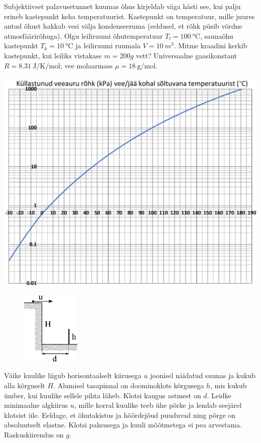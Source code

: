 \documentclass[10pt]{article}
\begin{document}
Subjektiivset palavusetunnet kuumas õhus kirjeldab väga hästi see, kui palju erineb kastepunkt keha temperatuurist. Kastepunkt on temperatuur, mille juures antud õhust hakkab vesi välja kondenseeruma (eeldusel, et rõhk püsib võrdne atmosfäärirõhuga). Olgu leiliruumi õhutemperatuur $T_l=\SI{100}{\celsius}$, saunaõhu kastepunkt $T_k=\SI{10}{\celsius}$ ja leiliruumi ruumala $V=\SI{10}{m^3}$. Mitme kraadini kerkib kastepunkt, kui leiliks vistakase $m=\SI{200}g$ vett? Universaalne gaasikonstant $R=\SI{8.31}{\joule\per\kelvin\per\mole}$; vee molaarmass $\mu=\SI{18}{\gram \per \mole}$.
\begin{center}
    \includegraphics[width=\textwidth]{2022-lahg-06-yl.pdf}
\end{center}
\probend
\bigskip


\begin{figure}
  \vspace{-2em}
  \begin{center}
    \includegraphics[width=2.8cm]{2022-v2g-06-yl.pdf}
  \end{center}
  \vspace{-2em}
\end{figure}
Väike kuulike liigub horisontaalselt kiirusega $u$ joonisel näidatud suunas ja kukub alla kõrguselt $H$. Alumisel tasapinnal on doominoklots kõrgusega $h$, mis kukub ümber, kui kuulike sellele pihta läheb. Klotsi kaugus astmest on $d$. Leidke minimaalne algkiirus $u$, mille korral kuulike teeb ühe põrke ja lendab seejärel klotsist üle. Eeldage, et õhutakistus ja hõõrdejõud puuduvad ning põrge on absoluutselt elastne. Klotsi paksusega ja kuuli mõõtmetega ei pea arvestama. Raskuskiirendus on $g$.
\probend
\bigskip
\end{document}
